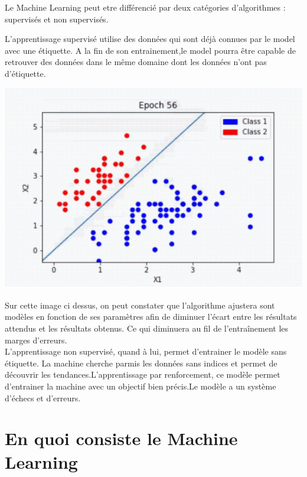\documentclass[12pt,a4paper]{report}
\begin{document}
Le Machine Learning peut etre différencié par deux catégories d'algorithmes : supervisés et non supervisés.

L'apprentissage supervisé utilise des données qui sont déjà connues par le model avec une étiquette. A la fin de son entrainement,le model pourra être capable de retrouver des données dans le même domaine dont les données n'ont pas d'étiquette.\\


\begin{center}
	\includegraphics[scale=0.4]{machine_learing_1}
	\label{fig1}
\end{center}


Sur cette image ci dessus, on peut constater que l'algorithme ajustera sont modèles en fonction de ses paramètres afin de diminuer l'écart entre les résultats attendus et les résultats obtenus. Ce qui diminuera au fil de l'entraînement les marges d'erreurs. \\

L'apprentissage non supervisé, quand à lui, permet d'entrainer le modèle sans étiquette. La machine cherche parmis les données sans indices et permet de découvrir les tendances.L'apprentissage par renforcement, ce modèle permet d'entrainer la machine avec un objectif bien précis.Le modèle a un système d'échecs et d'erreurs. \\






\section{En quoi consiste le Machine Learning}
\end{document}
